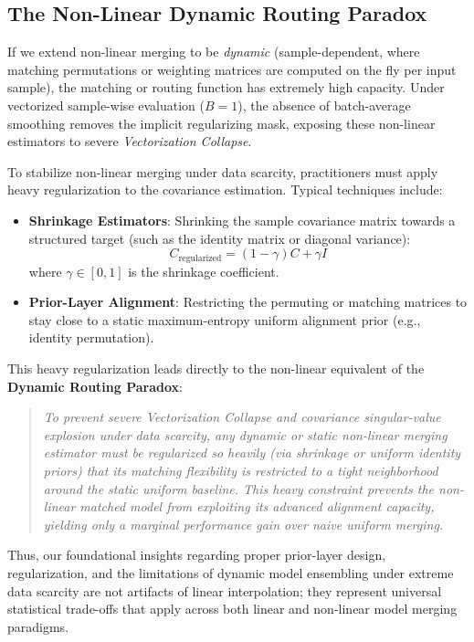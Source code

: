 \documentclass{article}
\theoremstyle{plain}
\theoremstyle{definition}
\theoremstyle{remark}
\begin{document}
\subsection{The Non-Linear Dynamic Routing Paradox}
If we extend non-linear merging to be \emph{dynamic} (sample-dependent, where matching permutations or weighting matrices are computed on the fly per input sample), the matching or routing function has extremely high capacity. Under vectorized sample-wise evaluation ($B=1$), the absence of batch-average smoothing removes the implicit regularizing mask, exposing these non-linear estimators to severe \emph{Vectorization Collapse}.

To stabilize non-linear merging under data scarcity, practitioners must apply heavy regularization to the covariance estimation. Typical techniques include:
\begin{itemize}
    \item \textbf{Shrinkage Estimators}: Shrinking the sample covariance matrix towards a structured target (such as the identity matrix or diagonal variance):
    \begin{equation}
        C_{\text{regularized}} = (1 - \gamma) C + \gamma I
    \end{equation}
    where $\gamma \in [0, 1]$ is the shrinkage coefficient.
    \item \textbf{Prior-Layer Alignment}: Restricting the permuting or matching matrices to stay close to a static maximum-entropy uniform alignment prior (e.g., identity permutation).
\end{itemize}

This heavy regularization leads directly to the non-linear equivalent of the \textbf{Dynamic Routing Paradox}:
\begin{quote}
    \emph{To prevent severe Vectorization Collapse and covariance singular-value explosion under data scarcity, any dynamic or static non-linear merging estimator must be regularized so heavily (via shrinkage or uniform identity priors) that its matching flexibility is restricted to a tight neighborhood around the static uniform baseline. This heavy constraint prevents the non-linear matched model from exploiting its advanced alignment capacity, yielding only a marginal performance gain over naive uniform merging.}
\end{quote}
Thus, our foundational insights regarding proper prior-layer design, regularization, and the limitations of dynamic model ensembling under extreme data scarcity are not artifacts of linear interpolation; they represent universal statistical trade-offs that apply across both linear and non-linear model merging paradigms.
\end{document}
